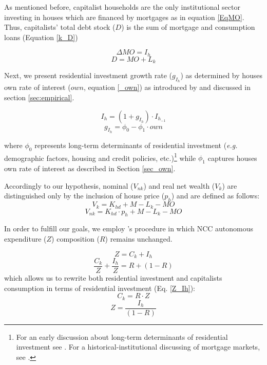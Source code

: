 \documentclass[12pt]{article}
\begin{document}
As mentioned before, capitalist households are the only institutional sector investing in houses which are financed by mortgages as in equation \ref{EqMO}.
Thus, capitalists' total debt stock (\(D\)) is the sum of mortgage and consumption loans (Equation \ref{k_D})

\begin{equation}
  \label{EqMO}
  \Delta MO = I_h
\end{equation}
\begin{equation}
  \label{k_D}
  D =  MO + L_k
\end{equation}



Next, we present residential investment growth rate (\(g_{I_h}\)) as determined by houses own rate of interest (\(own\), equation \ref{_own}) as introduced by \textcite{teixeira_crescimento_2015} and discussed in section \ref{sec:empirical}.


\begin{equation}
	I_h = (1 + g_{I_h})\cdot I_{h_{-1}}
\end{equation}
\begin{equation}
	\label{g_Z_own}
	g_{I_h} = \phi_0 - \phi_1\cdot own
\end{equation}

where  \(\phi_0\) represents long-term determinants of residential investment (\emph{e.g.} demographic factors, housing and credit policies, etc.)\footnote{For an early discussion about long-term determinants of residential investment see \textcite{grebler_capital_1956}. For a historical-institutional discussing of mortgage markets, see \textcite{green_american_2005}.} while \(\phi_1\) captures houses own rate of interest as described in Section \ref{sec_own}.

Accordingly to our hypothesis, nominal (\(V_{nk}\)) and real net wealth (\(V_{k}\)) are distinguished only by the inclusion of house price (\(p_h\)) and are defined as follows:
\begin{equation}
V_{k} = K_{hd} + M - L_{k} - MO
\end{equation}
\begin{equation}
V_{nk} = K_{hd}\cdot p_h + M - L_{k} - MO
\end{equation}


In order to fulfill our goals, we employ \citeauthor*{freitas_baseline_2020}'s \citeyear{freitas_baseline_2020} procedure in which NCC autonomous expenditure (\(Z\)) composition (\(R\)) remains unchanged.

\begin{equation}
\label{_Z}
Z = C_k + I_h
\end{equation}
$$
\frac{C_k}{Z} + \frac{I_h}{Z} = R + (1-R)
$$
which allows us to rewrite both residential investment and capitalists consumption in terms of residential investment (Eq. \ref{Z_Ih}):
\begin{equation}
\label{_Ck}
    C_k = R\cdot Z
\end{equation}
\begin{equation}
\label{Z_Ih}
Z = \frac{I_h}{(1-R)}
\end{equation}
\end{document}

